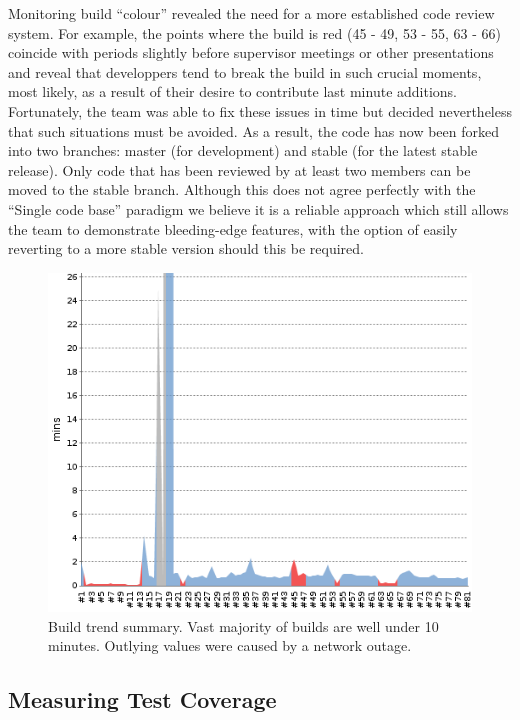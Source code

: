 \documentclass[10pt]{article}
\begin{document}
Monitoring build ``colour'' revealed the need for a more established code review system. For example, the points where the build is red (45 - 49, 53 - 55, 63 - 66) coincide with periods slightly before supervisor meetings or other presentations and reveal that developpers tend to break the build in such crucial moments, most likely, as a result of their desire to contribute last minute additions. Fortunately, the team was able to fix these issues in time but decided nevertheless that such situations must be avoided. As a result, the code has now been forked into two branches: master (for development) and stable (for the latest stable release). Only code that has been reviewed by at least two members can be moved to the stable branch. Although this does not agree perfectly with the ``Single code base'' paradigm we believe it is a reliable approach which still allows the team to demonstrate bleeding-edge features, with the option of easily reverting to a more stable version should this be required.

\begin{figure}[ht]
\centering
\includegraphics[bb=0 0 500 400, scale = 0.3]{build-trend.png}
\caption{Build trend summary. Vast majority of builds are well under 10 minutes. Outlying values were caused by a network outage.}
\end{figure}

\subsection{Measuring Test Coverage}
\end{document}
